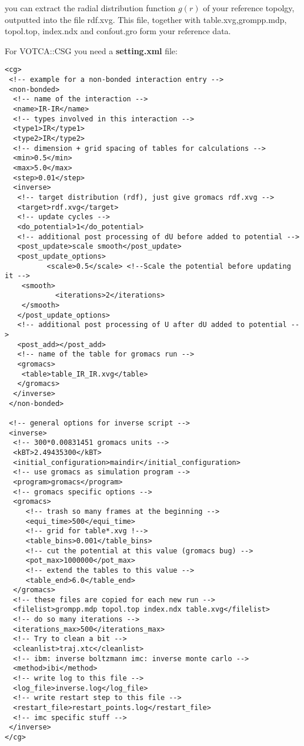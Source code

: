 you can extract the radial distribution function $g(r)$ of your reference topolgy, outputted into the file rdf.xvg. This file, together with table.xvg,grompp.mdp, topol.top, index.ndx and confout.gro form your reference data.

For VOTCA::CSG you need a \textbf{setting.xml} file:

\lstset{language=XML}
\begin{lstlisting}
<cg>
 <!-- example for a non-bonded interaction entry -->
 <non-bonded>
  <!-- name of the interaction -->
  <name>IR-IR</name>
  <!-- types involved in this interaction -->
  <type1>IR</type1>
  <type2>IR</type2>
  <!-- dimension + grid spacing of tables for calculations -->
  <min>0.5</min>
  <max>5.0</max>
  <step>0.01</step>
  <inverse>
   <!-- target distribution (rdf), just give gromacs rdf.xvg -->
   <target>rdf.xvg</target>
   <!-- update cycles -->
   <do_potential>1</do_potential>
   <!-- additional post processing of dU before added to potential -->
   <post_update>scale smooth</post_update>
   <post_update_options>
          <scale>0.5</scale> <!--Scale the potential before updating it -->
   	<smooth>
        	<iterations>2</iterations>
   	</smooth>
   </post_update_options>
   <!-- additional post processing of U after dU added to potential -->
   <post_add></post_add>
   <!-- name of the table for gromacs run -->
   <gromacs>
    <table>table_IR_IR.xvg</table>
   </gromacs>
  </inverse>
 </non-bonded>
   
 <!-- general options for inverse script -->
 <inverse>
  <!-- 300*0.00831451 gromacs units -->
  <kBT>2.49435300</kBT>
  <initial_configuration>maindir</initial_configuration>
  <!-- use gromacs as simulation program -->
  <program>gromacs</program>
  <!-- gromacs specific options -->
  <gromacs>
     <!-- trash so many frames at the beginning -->
     <equi_time>500</equi_time>
     <!-- grid for table*.xvg !-->
     <table_bins>0.001</table_bins>
     <!-- cut the potential at this value (gromacs bug) -->
     <pot_max>1000000</pot_max>
     <!-- extend the tables to this value -->
     <table_end>6.0</table_end>
  </gromacs>
  <!-- these files are copied for each new run -->
  <filelist>grompp.mdp topol.top index.ndx table.xvg</filelist>
  <!-- do so many iterations -->
  <iterations_max>500</iterations_max>
  <!-- Try to clean a bit -->
  <cleanlist>traj.xtc</cleanlist>
  <!-- ibm: inverse boltzmann imc: inverse monte carlo -->
  <method>ibi</method>
  <!-- write log to this file -->
  <log_file>inverse.log</log_file>
  <!-- write restart step to this file -->
  <restart_file>restart_points.log</restart_file>
  <!-- imc specific stuff -->
 </inverse>
</cg>
\end{lstlisting}

